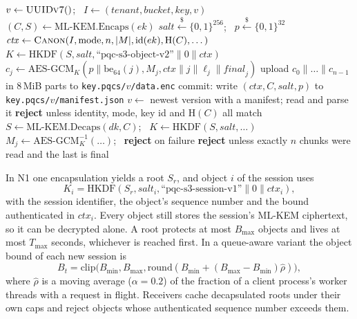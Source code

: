 \documentclass[conference]{IEEEtran}
\begin{document}
\begin{algorithm}[t]
\caption{Per-object PUT and GET (mode P1)}
\label{alg:putget}
\footnotesize
\begin{algorithmic}[1]
\State $v \gets \textsc{UUIDv7}()$; \ $I \gets (\mathit{tenant},\mathit{bucket},\mathit{key},v)$
\State $(C,S) \gets \mathrm{ML\mbox{-}KEM.Encaps}(ek)$
\State $\mathit{salt} \xleftarrow{\$} \{0,1\}^{256}$; \ $p \xleftarrow{\$} \{0,1\}^{32}$
\State $\mathit{ctx} \gets \textsc{Canon}(I,\text{mode},n,|M|,\mathrm{id}(ek),\mathrm{H}(C),\dots)$
\State $K \gets \mathrm{HKDF}(S,\mathit{salt},\text{``pqc-s3-object-v2''}\|0\|\mathit{ctx})$
 
\State $c_j \gets \mathrm{AES\mbox{-}GCM}_K(p\|\mathrm{be}_{64}(j), M_j, \mathit{ctx}\|j\|\ell_j\|\mathit{final}_j)$
\EndFor
\State upload $c_0\|\dots\|c_{n-1}$ in 8\,MiB parts to \texttt{key.pqcs/$v$/data.enc}
\State commit: write $(\mathit{ctx},C,\mathit{salt},p)$ to \texttt{key.pqcs/$v$/manifest.json}
\EndProcedure
{}
\State $v \gets$ newest version with a manifest; read and parse it
\State \textbf{reject} unless identity, mode, key id and $\mathrm{H}(C)$ all match
\State $S \gets \mathrm{ML\mbox{-}KEM.Decaps}(dk,C)$; \ $K \gets \mathrm{HKDF}(S,\mathit{salt},\dots)$
\State $M_j \gets \mathrm{AES\mbox{-}GCM}^{-1}_K(\dots)$; \ \textbf{reject} on failure
\EndFor
\State \textbf{reject} unless exactly $n$ chunks were read and the last is final
\EndProcedure
\end{algorithmic}
\end{algorithm}

In N1 one encapsulation yields a root $S_r$, and object $i$ of the session uses
\[K_i=\mathrm{HKDF}(S_r,\mathit{salt}_i,\text{``pqc-s3-session-v1''}\|0\|\mathit{ctx}_i),\]
with the session identifier, the object's sequence number and the bound authenticated in
$\mathit{ctx}_i$. Every object still stores the session's ML-KEM ciphertext, so it can be
decrypted alone. A root protects at most $B_{\max}$ objects and lives at most $T_{\max}$ seconds,
whichever is reached first. In a queue-aware variant the object bound of each new session is
\[B_t=\mathrm{clip}\bigl(B_{\min},B_{\max},\mathrm{round}(B_{\min}+(B_{\max}-B_{\min})\hat\rho)\bigr),\]
where $\hat\rho$ is a moving average ($\alpha=0.2$) of the fraction of a client process's worker
threads with a request in flight. Receivers cache decapsulated roots under their own caps and
reject objects whose authenticated sequence number exceeds them.
\end{document}

